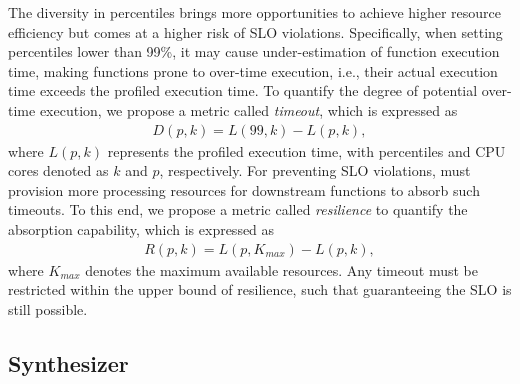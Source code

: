 
The diversity in percentiles brings more opportunities to achieve higher resource efficiency but comes at a higher risk of SLO violations.
Specifically, when setting percentiles lower than 99\%, it may cause under-estimation of function execution time, making functions prone to over-time execution, i.e., their actual execution time exceeds the profiled execution time.
To quantify the degree of potential over-time execution, we propose a metric called \emph{timeout}, which is expressed as
\begin{eqnarray}
     D(p,k) = L(99,k)-L(p,k),
\end{eqnarray}
where $L(p,k)$ represents the profiled execution time, with percentiles and CPU cores denoted as $k$ and $p$, respectively.
For preventing SLO violations, \namex must provision more processing resources for downstream functions to absorb such timeouts.
To this end, we propose a metric called \emph{resilience} to quantify the absorption capability, which is expressed as 
\begin{eqnarray}
    R(p,k)= L(p,K_{max})-L(p,k),
\end{eqnarray}
where $K_{max}$ denotes the maximum available resources.
Any timeout must be restricted within the upper bound of resilience, such that guaranteeing the SLO is still possible.

\subsection{Synthesizer}

